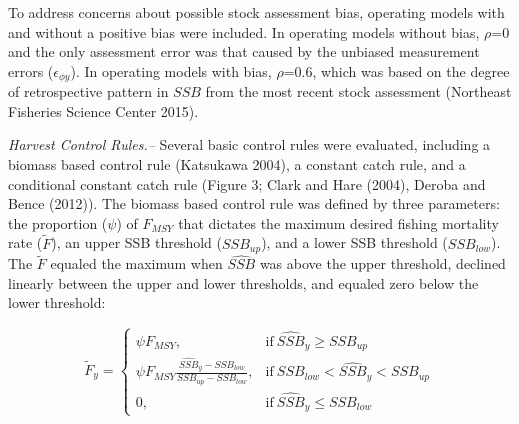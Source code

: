 \documentclass[]{article}
\begin{document}
To address concerns about possible stock assessment bias, operating
models with and without a positive bias were included. In operating
models without bias, \(\rho\)=0 and the only assessment error was that
caused by the unbiased measurement errors (\(\epsilon_{\phi y}\)). In
operating models with bias, \(\rho\)=0.6, which was based on the degree
of retrospective pattern in \(SSB\) from the most recent stock
assessment (Northeast Fisheries Science Center 2015).

\emph{Harvest Control Rules.--} Several basic control rules were
evaluated, including a biomass based control rule (Katsukawa 2004), a
constant catch rule, and a conditional constant catch rule (Figure 3;
Clark and Hare (2004), Deroba and Bence (2012)). The biomass based
control rule was defined by three parameters: the proportion (\(\psi\))
of \(F_{MSY}\) that dictates the maximum desired fishing mortality rate
(\(\tilde{F}\)), an upper SSB threshold (\(SSB_{up}\)), and a lower SSB
threshold (\(SSB_{low}\)). The \(\tilde{F}\) equaled the maximum when
\(\widehat{SSB}\) was above the upper threshold, declined linearly
between the upper and lower thresholds, and equaled zero below the lower
threshold:

\begin{equation}
  \label{Fy_equation}
    \tilde{F}_y=
    \begin{cases}
      \psi F_{MSY}, & \text{if}\ \widehat{SSB}_y \geq SSB_{up} \\
      \psi F_{MSY} \frac{\widehat{SSB}_y - SSB_{low}}{SSB_{up}-SSB_{low}}, & \text{if}\ SSB_{low} < \widehat{SSB}_y < SSB_{up}\\
      0, & \text{if}\ \widehat{SSB}_y \leq SSB_{low}
    \end{cases}
  \end{equation}
\end{document}
